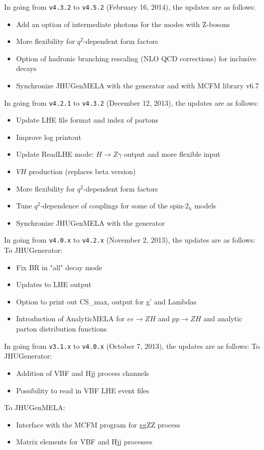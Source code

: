 \documentclass[aps,superscriptaddress,nofootinbib]{revtex4}
\begin{document}
\noindent
In going from \verb|v4.3.2| to \verb|v4.5.2| (February 16, 2014), the updates are as follows:
\begin{itemize}
\item Add an option of intermediate photons for the modes with Z-bosons
\item More flexibility for $q^2$-dependent form factors
\item Option of hadronic branching rescaling (NLO QCD corrections) for inclusive decays
\item Synchronize JHUGenMELA with the generator and with MCFM library v6.7
\end{itemize}
\noindent
In going from \verb|v4.2.1| to \verb|v4.3.2| (December 12, 2013), the updates are as follows:
\begin{itemize}
\item Update LHE file format and index of partons
\item Improve log printout
\item Update ReadLHE mode: $H\to Z\gamma$ output and more flexible input
\item $VH$ production (replaces beta version)
\item More flexibility for $q^2$-dependent form factors
\item Tune $q^2$-dependence of couplings for some of the spin-$2_h$ models
\item Synchronize JHUGenMELA with the generator
\end{itemize}
\noindent
In going from \verb|v4.0.x| to \verb|v4.2.x| (November 2, 2013), the updates are as follows:
To JHUGenerator:
\begin{itemize}
\item Fix BR in "all" decay mode
\item Updates to LHE output
\item Option to print out CS\_max, output for g' and Lambdas
\item Introduction of AnalyticMELA for $ee \to ZH$ and $pp \to ZH$ and analytic parton distribution functions
\end{itemize}
\noindent
In going from \verb|v3.1.x| to \verb|v4.0.x| (October 7, 2013), the updates are as follows:
To JHUGenerator:
\begin{itemize}
\item Addition of VBF and Hjj process channels
\item Possibility to read in VBF LHE event files
\end{itemize}
To JHUGenMELA:
\begin{itemize}
\item Interface with the MCFM program for ggZZ process
\item Matrix elements for VBF and Hjj processes
\end{itemize}
\end{document}

